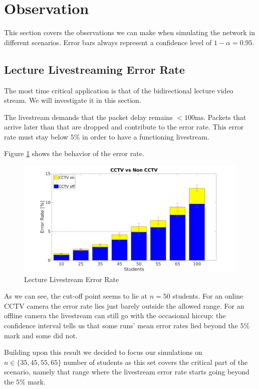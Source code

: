 \documentclass[a4paper]{scrreprt}
\begin{document}
	\section{Observation}\label{chp:observations}
		This section covers the observations we can make when simulating the network in different scenarios. Error bars always represent a confidence level of $1-\alpha =0.95$.
		
		\subsection{Lecture Livestreaming Error Rate}\label{sec:errorrate}
			The most time critical application is that of the bidirectional lecture video stream. We will investigate it in this section. 
			
			The livestream demands that the packet delay remains $<100\text{ms}$. Packets that arrive later than that are dropped and contribute to the error rate. This error rate must stay below $5\%$ in order to have a functioning livestream. 			
			
			Figure \ref{fig:errorrate} shows the behavior of the error rate. 		
			\begin{figure}[H]
				\center\includegraphics[width=\textwidth]{../Results_Analysis/Combining_1st_3rd_analysis/plot_all.png}
				\caption{Lecture Livestream Error Rate}
				\label{fig:errorrate}
			\end{figure}
			
			As we can see, the cut-off point seems to lie at $n=50$ students. For an online CCTV camera the error rate lies just barely outside the allowed range. For an offline camera the livestream can still go with the occasional hiccup: the confidence interval tells us that some runs' mean error rates lied beyond the $5\%$ mark and some did not.		
			
			Building upon this result we decided to focus our simulations on $n\in\{35,45,55,65\}$ number of students as this set covers the critical part of the scenario, namely that range where the livestream error rate starts going beyond the $5\%$ mark.
			
\end{document}
